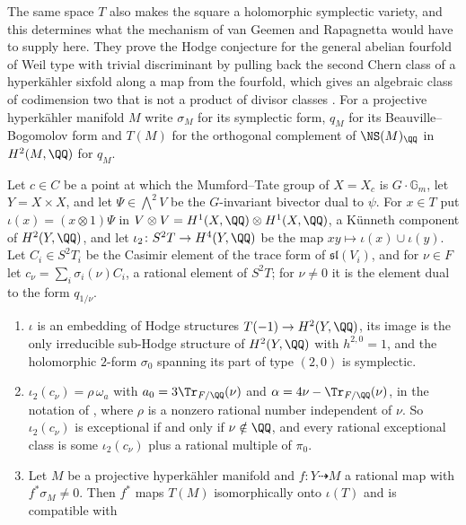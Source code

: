 The same space $T$ also makes the square a holomorphic symplectic variety,
and this determines what the mechanism of van Geemen and Rapagnetta would
have to supply here. They prove the Hodge conjecture for the general abelian
fourfold of Weil type with trivial discriminant by pulling back the second
Chern class of a hyperk\"ahler sixfold along a map from the fourfold, which
gives an algebraic class of codimension two that is not a product of divisor
classes \cite{vGR26}. For a projective hyperk\"ahler manifold $M$ write
$\sigma_{M}$ for its symplectic form, $q_{M}$ for its Beauville--Bogomolov
form and $T(M)$ for the orthogonal complement of $\NS(M)_{\QQ}$ in
$H^{2}(M,\QQ)$ for $q_{M}$.

\begin{proposition}\label{prop:hksquare}
Let $c\in C$ be a point at which the Mumford--Tate group of $X=X_{c}$ is
$G\cdot\mathbb{G}_{m}$, let $Y=X\times X$, and let $\Psi\in\bigwedge^{2}V$ be
the $G$-invariant bivector dual to $\psi$. For $x\in T$ put
$\iota(x)=(x\otimes1)\Psi$ in $V\otimes V=H^{1}(X,\QQ)\otimes H^{1}(X,\QQ)$, a
K\"unneth component of $H^{2}(Y,\QQ)$, and let $\iota_{2}\colon S^{2}T\to
H^{4}(Y,\QQ)$ be the map $xy\mapsto\iota(x)\cup\iota(y)$. Let $C_{i}\in
S^{2}T_{i}$ be the Casimir element of the trace form of
$\mathfrak{sl}(V_{i})$, and for $\nu\in F$ let
$c_{\nu}=\sum_{i}\sigma_{i}(\nu)C_{i}$, a rational element of $S^{2}T$; for
$\nu\ne0$ it is the element dual to the form $q_{1/\nu}$.
\begin{enumerate}[label=\textup{(\roman*)},leftmargin=2.6em,itemsep=2pt]
\item $\iota$ is an embedding of Hodge structures $T(-1)\to H^{2}(Y,\QQ)$, its
  image is the only irreducible sub-Hodge structure of $H^{2}(Y,\QQ)$ with
  $h^{2,0}=1$, and the holomorphic $2$-form $\sigma_{0}$ spanning its part of
  type $(2,0)$ is symplectic.
\item $\iota_{2}(c_{\nu})=\rho\,\omega_{a}$ with $a_{0}=3\Tr_{F/\QQ}(\nu)$ and
  $\alpha=4\nu-\Tr_{F/\QQ}(\nu)$, in the notation of ,
  where $\rho$ is a nonzero rational number independent of $\nu$. So
  $\iota_{2}(c_{\nu})$ is exceptional if and only if $\nu\notin\QQ$, and every
  rational exceptional class is some $\iota_{2}(c_{\nu})$ plus a rational
  multiple of $\pi_{0}$.
\item Let $M$ be a projective hyperk\"ahler manifold and
  $f\colon Y\dashrightarrow M$ a rational map with $f^{*}\sigma_{M}\ne0$. Then
  $f^{*}$ maps $T(M)$ isomorphically onto $\iota(T)$ and is compatible with

\end{enumerate}
\end{proposition}
